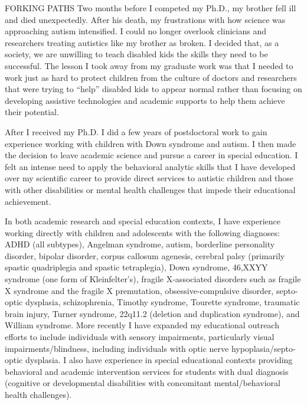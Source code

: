\documentclass{resume} %
\begin{document}
\begin{rSection}{FORKING PATHS}
Two months before I competed my Ph.D., my brother fell ill and died unexpectedly. After his death, my frustrations with how science was approaching autism intensified. I could no longer overlook clinicians and researchers treating autistics like my brother as broken. I decided that, as a society, we are unwilling to teach disabled kids the skills they need to be successful. The lesson I took away from my graduate work was that I needed to work just as hard to protect children from the culture of doctors and researchers that were trying to “help” disabled kids to appear normal rather than focusing on developing assistive technologies and academic supports to help them achieve their potential.

After I received my Ph.D. I did a few years of postdoctoral work to gain experience working with children with Down syndrome and autism. I then made the decision to leave academic science and pursue a career in special education. I felt an intense need to apply the behavioral analytic skills that I have developed over my scientific career to provide direct services to autistic children and those with other disabilities or mental health challenges that impede their educational achievement.

In both academic research and special education contexts, I have experience working directly with children and adolescents with the following diagnoses: ADHD (all subtypes), Angelman syndrome, autism, borderline personality disorder, bipolar disorder, corpus callosum agenesis, cerebral palsy (primarily spastic quadriplegia and spastic tetraplegia), Down syndrome, 46,XXYY syndrome (one form of Kleinfelter’s), fragile X-associated disorders such as fragile X syndrome and the fragile X premutation, obsessive-compulsive disorder, septo-optic dysplasia, schizophrenia, Timothy syndrome, Tourette syndrome, traumatic brain injury, Turner syndrome, 22q11.2 (deletion and duplication syndrome), and William syndrome. More recently I have expanded my educational outreach efforts to include individuals with sensory impairments, particularly visual impairments/blindness, including individuals with optic nerve hypoplasia/septo-optic dysplasia. I also have experience in special educational contexts providing behavioral and academic intervention services for students with dual diagnosis (cognitive or developmental disabilities with concomitant mental/behavioral health challenges).
\end{rSection}
\end{document}
